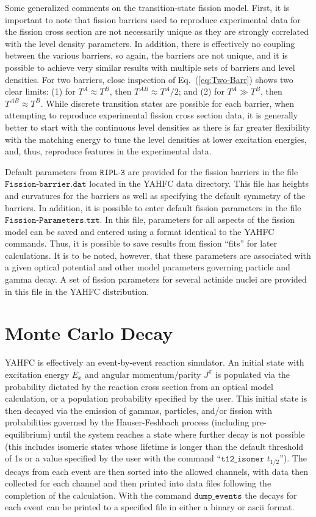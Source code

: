 \documentclass[
10pt,
showpacs,preprintnumbers,footinbib,
amsfonts,amsmath,amssymb,
aps,
prc,twocolumn,groupedaddress,superscriptaddress,
showkeys,
nofootinbib
]{revtex4-1}
\begin{document}
Some generalized comments on the transition-state fission model. First, it is important to note that fission barriers used to reproduce experimental data for the fission cross section are not necessarily unique as they are strongly correlated with the level density parameters. In addition, there is effectively no coupling between the various barriers, so again, the barriers are not unique, and it is possible to achieve very similar results with multiple sets of barriers and level densities. For two barriers, close inspection of Eq.~(\ref{eq:Two-Barr}) shows two clear limits: (1) for $T^A \approx T^B$, then $T^{AB} \approx T^A/2$; and (2) for $T^A \gg T^B$, then $T^{AB} \approx T^B$. While discrete transition states are possible for each barrier, when attempting to reproduce experimental fission cross section data, it is generally better to start with the continuous level densities as there is far greater flexibility with the matching energy to tune the level densities at lower excitation energies, and, thus, reproduce features in the experimental data.

Default parameters from ${\texttt{RIPL-3}}$ are provided for the fission barriers in the file ${\texttt{Fission-barrier.dat}}$ located in the YAHFC data directory. This file has heights and curvatures for the barriers as well as specifying the default symmetry of the barriers. In addition, it is possible to enter default fission parameters in the file ${\texttt{Fission-Parameters.txt}}$. In this file, parameters for all aspects of the fission model can be saved and entered using a format identical to the YAHFC commands. Thus, it is possible to save results from fission ``fits'' for later calculations. It is to be noted, however, that these parameters are associated with a given optical potential and other model parameters governing particle and gamma decay. A set of fission parameters for several actinide nuclei are provided in this file in the YAHFC distribution.

\section{Monte Carlo Decay}

YAHFC is effectively an event-by-event reaction simulator. An initial state with excitation energy $E_x$ and angular momentum/parity $J^\pi$ is populated via the probability dictated by the reaction cross section from an optical model calculation, or a population probability specified by the user. This initial state is then decayed via the emission of gammas, particles, and/or fission with probabilities governed by the Hauser-Feshbach process (including pre-equilibrium) until the system reaches a state where further decay is not possible (this includes isomeric states whose lifetime is longer than the default threshold of 1s or a value  specified by the user with the command ``${\texttt{t12\_isomer }}t_{1/2}$''). The decays from each event are then sorted into the allowed channels, with data then collected for each channel and then printed into data files following the completion of the calculation. With the command ${\texttt{dump\_events}}$ the decays for each event can be printed to a specified file in either a binary or ascii format.  
\end{document}
